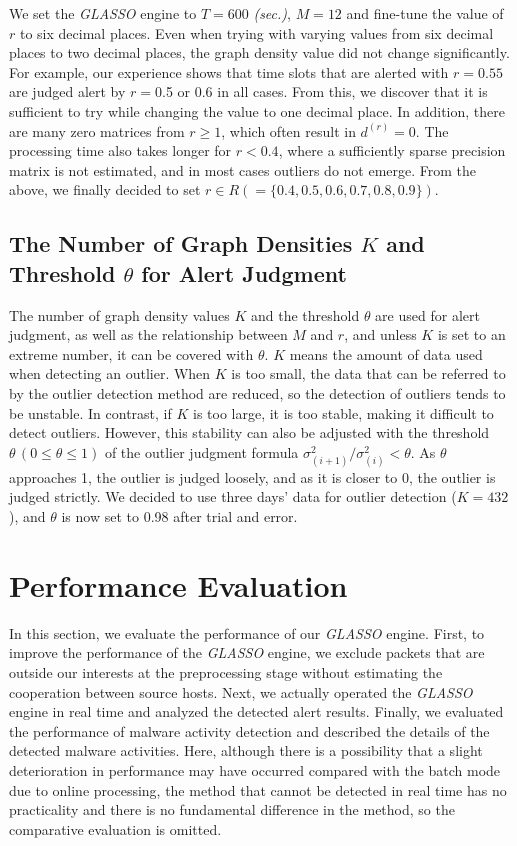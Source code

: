 \documentclass[conference]{IEEEtran}
\begin{document}
We set the {\it GLASSO} engine to $T=600$ {\it (sec.)}, $M=12$ and fine-tune the value of $r$ to six decimal places.
Even when trying with varying values from six decimal places to two decimal places, the graph density value did not change significantly.
For example, our experience shows that time slots that are alerted with $r=0.55$ are judged alert by $r=$0.5 or 0.6 in all cases.
From this, we discover that it is sufficient to try while changing the value to one decimal place.
In addition, there are many zero matrices from $r\geq 1$, which often result in $d^{(r)}=0$.
The processing time also takes longer for $r < 0.4$, where a sufficiently sparse precision matrix is not estimated, and in most cases outliers do not emerge.
From the above, we finally decided to set $r \in R ( = \{0.4, 0.5, 0.6, 0.7, 0.8, 0.9\})$.



\subsection{The Number of Graph Densities $K$ and Threshold $\theta$ for Alert Judgment}
The number of graph density values $K$ and the threshold $\theta$ are used for alert judgment, as well as the relationship between $M$ and $r$, and unless $K$ is set to an extreme number, it can be covered with $\theta$.
$K$ means the amount of data used when detecting an outlier.
When $K$ is too small, the data that can be referred to by the outlier detection method are reduced, so the detection of outliers tends to be unstable.
In contrast, if $K$ is too large, it is too stable, making it difficult to detect outliers.
However, this stability can also be adjusted with the threshold $\theta \, (0\leq \theta \leq 1)$ of the outlier judgment formula $\sigma^{2}_{(i+1)}/\sigma^{2}_{(i)}<\theta$.
As $\theta$ approaches 1, the outlier is judged loosely, and as it is closer to 0, the outlier is judged strictly.
We decided to use three days' data for outlier detection ($K=432$), and $\theta$ is now set to 0.98 after trial and error.



\section{Performance Evaluation}
In this section, we evaluate the performance of our {\it GLASSO} engine.
First, to improve the performance of the {\it GLASSO} engine, we exclude packets that are outside our interests at the preprocessing stage without estimating the cooperation between source hosts.
Next, we actually operated the {\it GLASSO} engine in real time and analyzed the detected alert results.
Finally, we evaluated the performance of malware activity detection and described the details of the detected malware activities.
Here, although there is a possibility that a slight deterioration in performance may have occurred compared with the batch mode due to online processing, the method that cannot be detected in real time has no practicality and there is no fundamental difference in the method, so the comparative evaluation is omitted.
\end{document}
